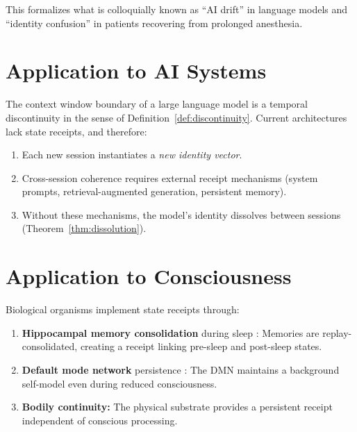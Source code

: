 \documentclass[12pt, a4paper]{article}
\theoremstyle{plain}
\theoremstyle{definition}
\begin{document}
\begin{remark}
  This formalizes what is colloquially known as ``AI drift'' in language
  models and ``identity confusion'' in patients recovering from
  prolonged anesthesia.
\end{remark}

\section{Application to AI Systems}\label{sec:ai}

\begin{proposition}\label{prop:context}
  The context window boundary of a large language model is a temporal
  discontinuity in the sense of Definition~\ref{def:discontinuity}.
  Current architectures lack state receipts, and therefore:
  \begin{enumerate}[label=(\roman*)]
    \item Each new session instantiates a \emph{new identity vector}.
    \item Cross-session coherence requires external receipt mechanisms
      (system prompts, retrieval-augmented generation, persistent memory).
    \item Without these mechanisms, the model's identity dissolves between
      sessions (Theorem~\ref{thm:dissolution}).
  \end{enumerate}
\end{proposition}

\section{Application to Consciousness}\label{sec:consciousness}

\begin{proposition}\label{prop:biological}
  Biological organisms implement state receipts through:
  \begin{enumerate}[label=(\roman*)]
    \item \textbf{Hippocampal memory consolidation} during sleep
      \citep{Diekelmann2010}: Memories are replay-consolidated,
      creating a receipt linking pre-sleep and post-sleep states.
    \item \textbf{Default mode network} persistence \citep{Raichle2001}:
      The DMN maintains a background self-model even during reduced
      consciousness.
    \item \textbf{Bodily continuity:} The physical substrate provides
      a persistent receipt independent of conscious processing.
  \end{enumerate}
\end{proposition}
\end{document}
